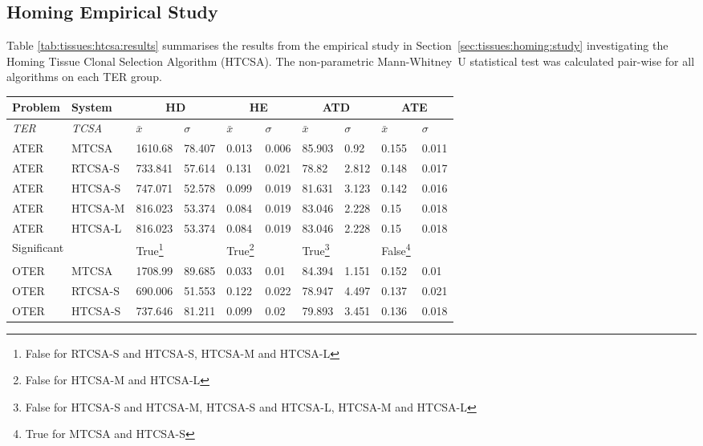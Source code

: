 %
%
\subsection{Homing Empirical Study}
\label{appendix:results:tissues:homing}
Table \ref{tab:tissues:htcsa:results} summarises the results from the empirical study in Section~\ref{sec:tissues:homing:study} investigating the Homing Tissue Clonal Selection Algorithm (HTCSA). The non-parametric Mann-Whitney~U statistical test was calculated pair-wise for all algorithms on each TER group. 

\begin{table}[H]
	\centering\small
		\begin{minipage}{\textwidth}
			\begin{tabular}{llllllllll}
			\toprule
			\textbf{Problem} & \textbf{System} & \multicolumn{2}{c}{\textbf{HD}} & \multicolumn{2}{c}{\textbf{HE}} & \multicolumn{2}{c}{\textbf{ATD}} & \multicolumn{2}{c}{\textbf{ATE}} \\ 
			\midrule
			\emph{TER} & \emph{TCSA} & $\bar{x}$ & $\sigma$ & $\bar{x}$ & $\sigma$ & $\bar{x}$ & $\sigma$ & $\bar{x}$ & $\sigma$ \\ 
			\toprule
			ATER & MTCSA & 1610.68 & 78.407 & 0.013 & 0.006 & 85.903 & 0.92 & 0.155 & 0.011 \\ 
			ATER & RTCSA-S & 733.841 & 57.614 & 0.131 & 0.021 & 78.82 & 2.812 & 0.148 & 0.017 \\ 
			ATER & HTCSA-S & 747.071 & 52.578 & 0.099 & 0.019 & 81.631 & 3.123 & 0.142 & 0.016 \\ 
			ATER & HTCSA-M & 816.023 & 53.374 & 0.084 & 0.019 & 83.046 & 2.228 & 0.15 & 0.018 \\ 
			ATER & HTCSA-L & 816.023 & 53.374 & 0.084 & 0.019 & 83.046 & 2.228 & 0.15 & 0.018 \\ 
			\multicolumn{2}{l}{Significant} & True\footnote{False for RTCSA-S and HTCSA-S, HTCSA-M and HTCSA-L} &  & True\footnote{False for HTCSA-M and HTCSA-L} &  & True\footnote{False for HTCSA-S and HTCSA-M, HTCSA-S and HTCSA-L, HTCSA-M and HTCSA-L} &  & False\footnote{True for MTCSA and HTCSA-S} &  \\ 
			\midrule
			OTER & MTCSA & 1708.99 & 89.685 & 0.033 & 0.01 & 84.394 & 1.151 & 0.152 & 0.01 \\ 
			OTER & RTCSA-S & 690.006 & 51.553 & 0.122 & 0.022 & 78.947 & 4.497 & 0.137 & 0.021 \\ 
			OTER & HTCSA-S & 737.646 & 81.211 & 0.099 & 0.02 & 79.893 & 3.451 & 0.136 & 0.018 \\ 

\end{tabular}
\end{minipage}
\end{table}
